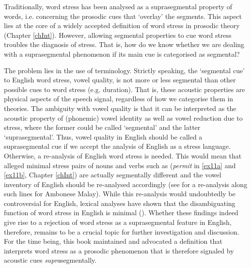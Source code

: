 Traditionally, word stress has been analysed as a suprasegmental property of words, i.e. concerning the prosodic cues that `overlay' the segments. This aspect lies at the core of a widely accepted definition of word stress in prosodic theory (Chapter \ref{chInt}). However, allowing segmental properties to cue word stress troubles the diagnosis of stress. That is, how do we know whether we are dealing with a suprasegmental phenomenon if its main cue is categorised as segmental?\par

The problem lies in the use of terminology. Strictly speaking, the `segmental cue' to English word stress, vowel quality, is not more or less segmental than other possible cues to word stress (e.g. duration). That is, these acoustic properties are physical aspects of the speech signal, regardless of how we categorise them in theories. The ambiguity with vowel quality is that it can be interpreted as the acoustic property of (phonemic) vowel identity as well as vowel reduction due to stress, where the former could be called `segmental' and the latter `suprasegmental'. Thus, vowel quality in English should be called a suprasegmental cue if we accept the analysis of English as a stress language. Otherwise, a re-analysis of English word stress is needed. This would mean that alleged minimal stress pairs of nouns and verbs such as (\textit{permit} in \ref{ex11a} and \ref{ex11b}, Chapter \ref{chInt}) are actually segmentally different and the vowel inventory of English should be re-analysed accordingly (see \citealt{maskikit-essed_no_2016} for a re-analysis along such lines for Ambonese Malay). While this re-analysis would undoubtedly be controversial for English, lexical analyses have shown that the disambiguating function of word stress in English is minimal (\citealt{cutler_phonemic_2004}). Whether these findings indeed give rise to a rejection of word stress as a suprasegmental feature in English, therefore, remains to be a crucial topic for further investigation and discussion. For the time being, this book maintained and advocated a definition that interprets word stress as a prosodic phenomenon that is therefore signaled by acoustic cues \textit{supra}segmentally.

